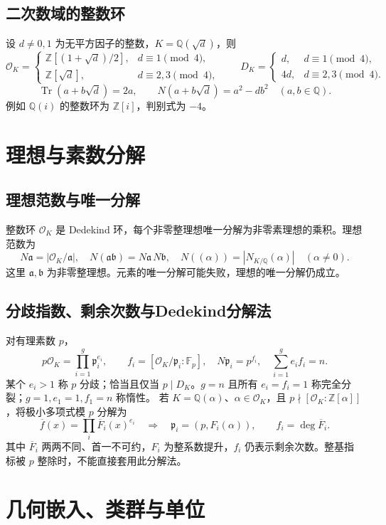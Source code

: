\documentclass[../main.tex]{subfiles}
\begin{document}
\subsection{二次数域的整数环}
设 $d\ne0,1$ 为无平方因子的整数，$K=\mathbb Q(\sqrt d)$，则
\[
\mathcal O_K=\begin{cases}\mathbb Z[(1+\sqrt d)/2],&d\equiv1\pmod4,\\
\mathbb Z[\sqrt d],&d\equiv2,3\pmod4,\end{cases}\qquad
D_K=\begin{cases}d,&d\equiv1\pmod4,\\4d,&d\equiv2,3\pmod4.\end{cases}
\]
\[
\operatorname{Tr}(a+b\sqrt d)=2a,\qquad N(a+b\sqrt d)=a^2-db^2\quad(a,b\in\mathbb Q).
\]
例如 $\mathbb Q(i)$ 的整数环为 $\mathbb Z[i]$，判别式为 $-4$。
\section{理想与素数分解}
\subsection{理想范数与唯一分解}
整数环 $\mathcal O_K$ 是 Dedekind 环，每个非零整理想唯一分解为非零素理想的乘积。理想范数为
\[
N\mathfrak a=|\mathcal O_K/\mathfrak a|,\quad
N(\mathfrak a\mathfrak b)=N\mathfrak a\,N\mathfrak b,\quad
N((\alpha))=|N_{K/\mathbb Q}(\alpha)|\quad(\alpha\ne0).
\]
这里 $\mathfrak a,\mathfrak b$ 为非零整理想。元素的唯一分解可能失败，理想的唯一分解仍成立。
\subsection{分歧指数、剩余次数与Dedekind分解法}
对有理素数 $p$，
\[
p\mathcal O_K=\prod_{i=1}^g\mathfrak p_i^{e_i},\qquad
f_i=[\mathcal O_K/\mathfrak p_i:\mathbb F_p],\quad
N\mathfrak p_i=p^{f_i},\quad\sum_{i=1}^ge_if_i=n.
\]
某个 $e_i>1$ 称 $p$ 分歧；恰当且仅当 $p\mid D_K$。$g=n$ 且所有 $e_i=f_i=1$ 称完全分裂；$g=1,e_1=1,f_1=n$ 称惰性。
若 $K=\mathbb Q(\alpha)$、$\alpha\in\mathcal O_K$，且 $p\nmid[\mathcal O_K:\mathbb Z[\alpha]]$，将极小多项式模 $p$ 分解为
\[
\overline f(x)=\prod_i\overline F_i(x)^{e_i}
\quad\Longrightarrow\quad
\mathfrak p_i=(p,F_i(\alpha)),\qquad f_i=\deg\overline F_i.
\]
其中 $\overline F_i$ 两两不同、首一不可约，$F_i$ 为整系数提升，$f_i$ 仍表示剩余次数。整基指标被 $p$ 整除时，不能直接套用此分解法。
\section{几何嵌入、类群与单位}
\end{document}
